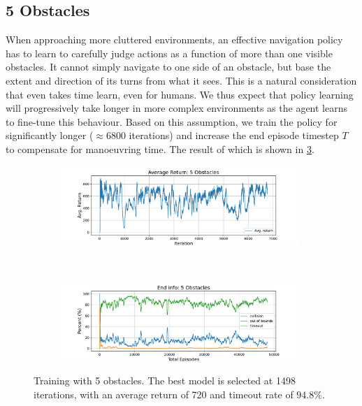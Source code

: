 \subsection{5 Obstacles}
\label{subsec:7_5_obstacles}
When approaching more cluttered environments, an effective navigation policy has to learn to carefully judge actions as a function of more than one visible obstacles. It cannot simply navigate to one side of an obstacle, but base the extent and direction of its turns from what it sees. This is a natural consideration that even takes time learn, even for humans. 
We thus expect that policy learning will progressively take longer in more complex environments as the agent learns to fine-tune this behaviour. Based on this assumption, we train the policy for significantly longer ($\approx 6800$ iterations) and increase the end episode timestep $T$ to compensate for manoeuvring time. The result of which is shown in \cref{fig:7_train_nav_5_obst}.
\begin{figure}[htb]
    \centering
    \begin{subfigure}[b]{\textwidth}
        \centering
        \captionsetup{justification=centering}
        \includegraphics[width=0.99\textwidth]{figures/7_/3DCarModel_BodyObs_NavSetup_5_NewObs_v1_reward.pdf}
        \label{fig:5_obst_nav_rew}
    \end{subfigure} \\
    \begin{subfigure}[b]{\textwidth}
        \centering
        \captionsetup{justification=centering}
        \includegraphics[width=0.99\textwidth]{figures/7_/3DCarModel_BodyObs_NavSetup_5_NewObs_v1_end_info.pdf}
        \label{fig:5_obst_nav_end}
    \end{subfigure} 
    \caption{Training with 5 obstacles. The best model is selected at 1498 iterations, with an average return of 720 and timeout rate of $94.8\%$.} %
    \label{fig:7_train_nav_5_obst}
\end{figure}
